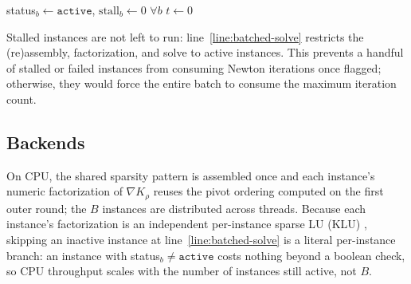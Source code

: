 \documentclass[conference]{IEEEtran}
\begin{document}
\begin{algorithm}[t]
\DontPrintSemicolon
{}
status$_b \gets \texttt{active}$, $\mathrm{stall}_b \gets 0$ \quad $\forall b$\;
$t \gets 0$\;
\caption{Batched primal-dual interior point}
\label{alg:batched}
\end{algorithm}

Stalled instances are not left to run: line~\ref{line:batched-solve} restricts
the (re)assembly, factorization, and solve to active instances. This prevents a handful of stalled or failed instances from consuming Newton
iterations once flagged; otherwise, they would force the entire batch to
consume the maximum iteration count.

\subsection{Backends}

On CPU, the shared sparsity pattern is assembled once and each instance's numeric
factorization of $\nabla K_\rho$ reuses the pivot ordering computed on the first
outer round; the $B$ instances are distributed across threads. Because each
instance's factorization is an independent per-instance sparse LU (KLU) \cite{davis2010algorithm}, skipping an
inactive instance at line~\ref{line:batched-solve} is a literal per-instance branch: an
instance with status$_b \ne \texttt{active}$ costs nothing beyond a boolean check, so
CPU throughput scales with the number of instances still active, not $B$.
\end{document}
